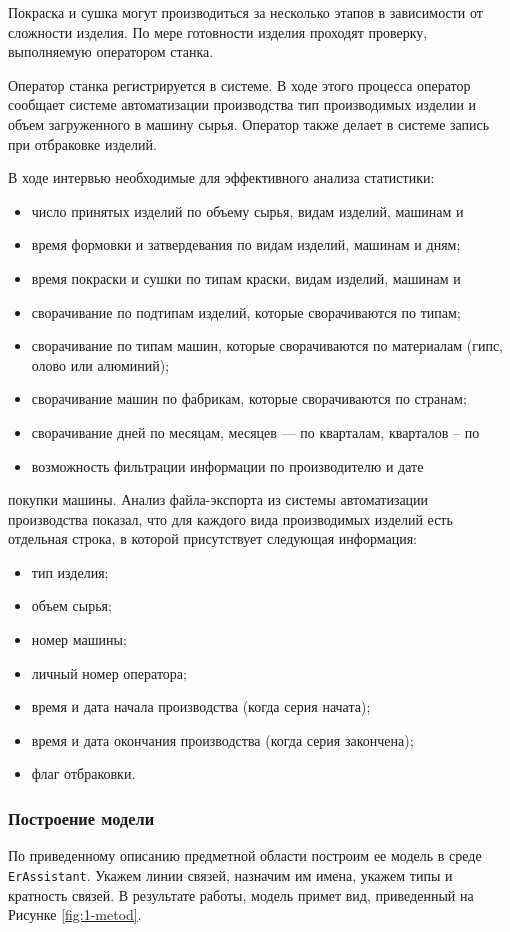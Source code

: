 \documentclass[a4paper,14pt]{extarticle}
\newcommand{\erassistant}{\texttt{ErAssistant}}
\begin{document}
Покраска и сушка могут производиться за несколько этапов в зависимости
от сложности изделия. По мере готовности изделия проходят проверку,
выполняемую оператором станка.

Оператор станка регистрируется в системе. В ходе этого процесса оператор
сообщает системе автоматизации производства тип производимых изделии и
объем загруженного в машину сырья. Оператор также делает в системе запись
при отбраковке изделий.

В ходе
интервью необходимые для эффективного анализа статистики:
\begin{itemize}

\item  число принятых изделий по объему сырья, видам изделий, машинам и
\item  время формовки и затвердевания по видам изделий, машинам и дням;
\item  время покраски и сушки по типам краски, видам изделий, машинам и
\item  сворачивание по подтипам изделий, которые сворачиваются по типам;
\item  сворачивание по типам машин, которые сворачиваются по материалам
(гипс, олово или алюминий);
\item  сворачивание машин по фабрикам, которые сворачиваются по странам;
\item  сворачивание дней по месяцам, месяцев — по кварталам, кварталов – по
\item  возможность фильтрации информации по производителю и дате
\end{itemize}
покупки машины.
Анализ файла-экспорта из системы автоматизации производства показал,
что для каждого вида производимых изделий есть отдельная строка, в которой
присутствует следующая информация:
\begin{itemize}
	\item  тип изделия;
	\item  объем сырья;
	\item  номер машины;
	\item  личный номер оператора;
	\item  время и дата начала производства (когда серия начата);
	\item  время и дата окончания производства (когда серия закончена);
	\item  флаг отбраковки.
\end{itemize}
\subsubsection*{Построение модели}
По приведенному описанию предметной области построим ее модель в среде \erassistant. Укажем линии связей, назначим им имена, укажем типы и кратность связей. В результате работы, модель примет вид, приведенный на Рисунке \ref{fig:1-metod}.
\end{document}
